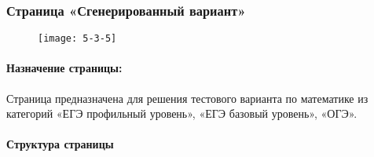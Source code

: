 \subsubsection{Страница «Сгенерированный вариант»}
\begin{figure}[H]
	\texttt{[image: 5-3-5]}
\end{figure}
\paragraph{Назначение страницы:} Страница предназначена для решения тестового варианта по математике из категорий «ЕГЭ профильный уровень», «ЕГЭ базовый уровень», «ОГЭ».

\paragraph{Структура страницы}
